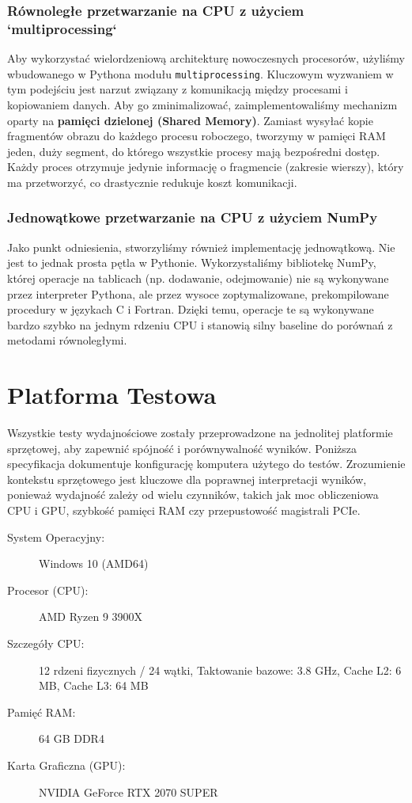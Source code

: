 \documentclass[12pt,a4paper]{article}
\begin{document}
\subsubsection{Równoległe przetwarzanie na CPU z użyciem `multiprocessing`}
Aby wykorzystać wielordzeniową architekturę nowoczesnych procesorów, użyliśmy wbudowanego w Pythona modułu \texttt{multiprocessing}. Kluczowym wyzwaniem w tym podejściu jest narzut związany z komunikacją między procesami i kopiowaniem danych. Aby go zminimalizować, zaimplementowaliśmy mechanizm oparty na \textbf{pamięci dzielonej (Shared Memory)}. Zamiast wysyłać kopie fragmentów obrazu do każdego procesu roboczego, tworzymy w pamięci RAM jeden, duży segment, do którego wszystkie procesy mają bezpośredni dostęp. Każdy proces otrzymuje jedynie informację o fragmencie (zakresie wierszy), który ma przetworzyć, co drastycznie redukuje koszt komunikacji.

\subsubsection{Jednowątkowe przetwarzanie na CPU z użyciem NumPy}
Jako punkt odniesienia, stworzyliśmy również implementację jednowątkową. Nie jest to jednak prosta pętla w Pythonie. Wykorzystaliśmy bibliotekę NumPy, której operacje na tablicach (np. dodawanie, odejmowanie) nie są wykonywane przez interpreter Pythona, ale przez wysoce zoptymalizowane, prekompilowane procedury w językach C i Fortran. Dzięki temu, operacje te są wykonywane bardzo szybko na jednym rdzeniu CPU i stanowią silny baseline do porównań z metodami równoległymi.

\newpage

\section{Platforma Testowa}
Wszystkie testy wydajnościowe zostały przeprowadzone na jednolitej platformie sprzętowej, aby zapewnić spójność i porównywalność wyników. Poniższa specyfikacja dokumentuje konfigurację komputera użytego do testów. Zrozumienie kontekstu sprzętowego jest kluczowe dla poprawnej interpretacji wyników, ponieważ wydajność zależy od wielu czynników, takich jak moc obliczeniowa CPU i GPU, szybkość pamięci RAM czy przepustowość magistrali PCIe.

\begin{description}
    \item[System Operacyjny:] Windows 10 (AMD64)
    \item[Procesor (CPU):] AMD Ryzen 9 3900X
    \item[Szczegóły CPU:] 12 rdzeni fizycznych / 24 wątki, Taktowanie bazowe: 3.8 GHz, Cache L2: 6 MB, Cache L3: 64 MB
    \item[Pamięć RAM:] 64 GB DDR4
    \item[Karta Graficzna (GPU):] NVIDIA GeForce RTX 2070 SUPER
\end{description}
\end{document}
